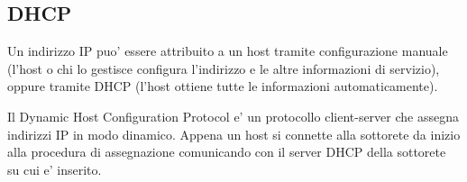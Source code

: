 \subsection{DHCP}
Un indirizzo IP puo' essere attribuito a un host tramite configurazione manuale (l'host o chi lo gestisce configura l'indirizzo e le altre informazioni di servizio), oppure tramite DHCP (l'host ottiene tutte le informazioni automaticamente).

Il Dynamic Host Configuration Protocol e' un protocollo client-server che assegna indirizzi IP in modo dinamico.
Appena un host si connette alla sottorete da inizio alla procedura di assegnazione comunicando con il server DHCP della sottorete su cui e' inserito.
